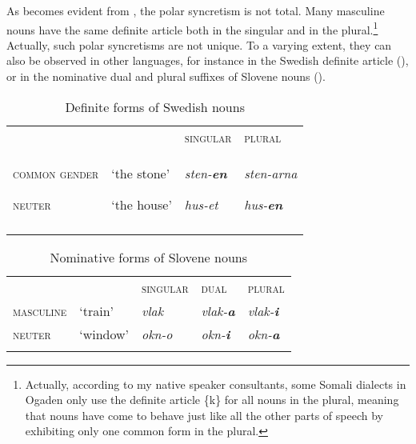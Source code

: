 \documentclass[output=paper]{langsci/langscibook}
\begin{document}
As becomes evident from , the polar syncretism is not total. Many masculine nouns have the same definite article both in the singular and in the plural.\footnote{Actually, according to my native speaker consultants, some Somali dialects in Ogaden only use the definite article \{k\} for all nouns in the plural, meaning that nouns have come to behave just like all the other parts of speech by exhibiting only one common form in the plural.} Actually, such polar syncretisms are not unique. To a varying extent, they can also be observed in other languages, for instance in the Swedish definite article (), or in the nominative dual and plural suffixes of Slovene nouns ().
 
\begin{table}
\caption{Definite forms of Swedish nouns}
\label{tab:nilsson:7}

\begin{tabularx}{\textwidth}{XXXX}
\lsptoprule
& & {\textsc{singular}} & {\textsc{plural}} \\
{\textsc{common gender}}

{\textsc{neuter}} & {‘the stone’}

{‘the house’} & {\textit{sten-}\textbf{\textit{en}}}

{\textit{hus-et}} &  {\textit{sten-arna}}

{\textit{hus-}\textbf{\textit{en}}} \\
\lspbottomrule
\end{tabularx}

\end{table} 

 
\begin{table}
\caption{Nominative forms of Slovene nouns}
\label{tab:nilsson:8}
\begin{tabularx}{\textwidth}{XXXXX}
\lsptoprule
& & {\textsc{singular}} &  {\textsc{dual}} & {\textsc{plural}} \\
{\textsc{masculine}} & {‘train’} & {\textit{vlak}} & {\textit{vlak-}\textbf{\textit{a}}} & {\textit{vlak-}\textbf{\textit{i}}} \\

{\textsc{neuter}} & {‘window’} & {\textit{okn-o}} & {\textit{okn-}\textbf{\textit{i}}} & {\textit{okn-}\textbf{\textit{a}}} \\
\lspbottomrule
\end{tabularx}

\end{table} 
\end{document}
